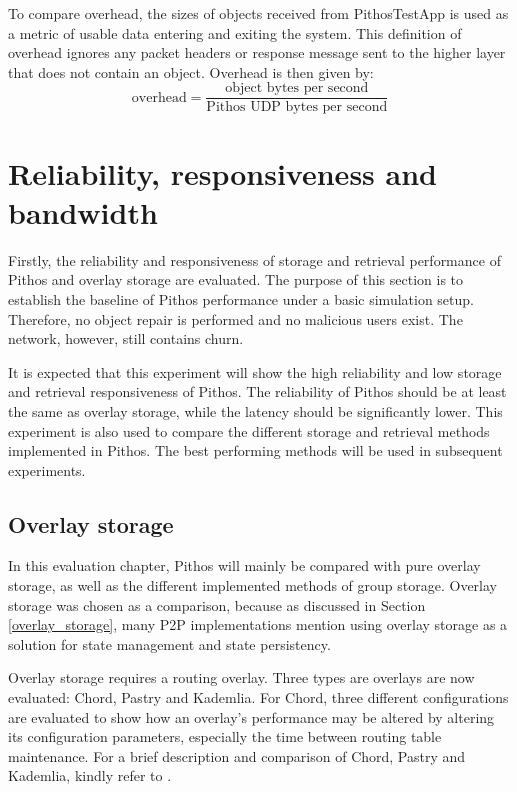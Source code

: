 To compare overhead, the sizes of objects received from PithosTestApp is used as a metric of usable data entering and exiting the system. This definition of overhead ignores any packet headers or response message sent to the higher layer that does not contain an object. Overhead is then given by:
%
\begin{equation}
\textrm{overhead} = \frac{\textrm{object bytes per second}}{\textrm{Pithos UDP bytes per second}}
\end{equation}

\section{Reliability, responsiveness and bandwidth}

Firstly, the reliability and responsiveness of storage and retrieval performance of Pithos and overlay storage are evaluated. The purpose of this section is to establish the baseline of Pithos performance under a basic simulation setup. Therefore, no object repair is performed and no malicious users exist. The network, however, still contains churn.

It is expected that this experiment will show the high reliability and low storage and retrieval responsiveness of Pithos. The reliability of Pithos should be at least the same as overlay storage, while the latency should be significantly lower. This experiment is also used to compare the different storage and retrieval methods implemented in Pithos. The best performing methods will be used in subsequent experiments.

\subsection{Overlay storage}
\label{overlay_results}

In this evaluation chapter, Pithos will mainly be compared with pure overlay storage, as well as the different implemented methods of group storage. Overlay storage was chosen as a comparison, because as discussed in Section \ref{overlay_storage}, many P2P implementations mention using overlay storage as a solution for state management and state persistency.

Overlay storage requires a routing overlay. Three types are overlays are now evaluated: Chord, Pastry and Kademlia. For Chord, three different configurations are evaluated to show how an overlay's performance may be altered by altering its configuration parameters, especially the time between routing table maintenance. For a brief description and comparison of Chord, Pastry and Kademlia, kindly refer to \cite{overlay_survey}.

